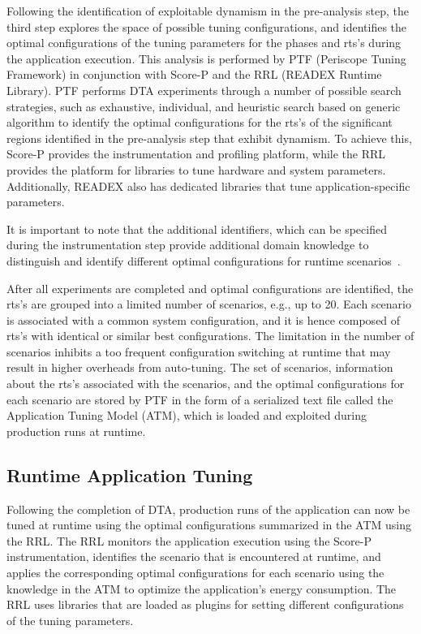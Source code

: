 Following the identification of exploitable dynamism in the pre-analysis step, the third step explores the space of possible tuning configurations, and identifies the optimal configurations of the tuning parameters for the phases and rts's during the application execution. This analysis is performed by PTF (Periscope Tuning Framework) in conjunction with Score-P and the RRL (READEX Runtime Library). PTF performs DTA experiments through a number of possible search strategies, such as exhaustive, individual, and heuristic search based on generic algorithm to identify the optimal configurations for the rts's of the significant regions identified in the pre-analysis step that exhibit dynamism. To achieve this, Score-P provides the instrumentation and profiling platform, while the RRL provides the platform for libraries to tune hardware and system parameters. Additionally, READEX also has dedicated libraries that tune application-specific parameters.

It is important to note that the additional identifiers, which can be specified during the instrumentation step provide additional domain knowledge to distinguish and identify different optimal configurations for runtime scenarios~\cite{PACO17}.

After all experiments are completed and optimal configurations are identified, the rts's are grouped into a limited number of scenarios, e.g., up to 20. Each scenario is associated with a common system configuration, and it is hence composed of rts's with identical or similar best configurations. The limitation in the number of scenarios inhibits a too frequent configuration switching at runtime that may result in higher overheads from auto-tuning. The set of scenarios, information about the rts's associated with the scenarios, and the optimal configurations for each scenario are stored by PTF in the form of a serialized text file called the Application Tuning Model (ATM), which is loaded and exploited during production runs at runtime.

\subsection{Runtime Application Tuning}
\label{sec:runtime_tuning}

Following the completion of DTA, production runs of the application can now be tuned at runtime using the optimal configurations summarized in the ATM using the RRL. The RRL monitors the application execution using the Score-P instrumentation, identifies the scenario that is encountered at runtime, and applies the corresponding optimal configurations for each scenario using the knowledge in the ATM to optimize the application's energy consumption. The RRL uses libraries that are loaded as plugins for setting different configurations of the tuning parameters.

